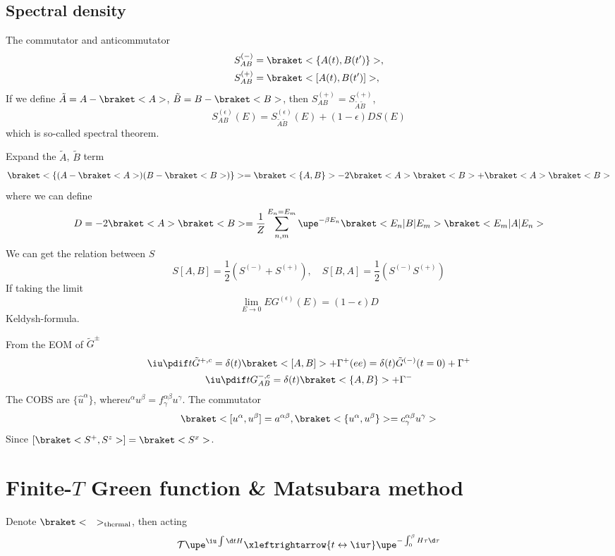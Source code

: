 \subsection{Spectral density}

The commutator and anticommutator
\begin{align*}
  S_{AB}^{(-)} & = \braket<\{A(t), B(t')\}>,\\
  S_{AB}^{(+)} & = \braket<[A(t), B(t')]>,
\end{align*}
If we define $\tilde A = A - \braket<A>$, $\tilde B = B - \braket<B>$,
then $S_{AB}^{(+)} = S_{\tilde A\tilde B}^{(+)}$,
\begin{equation}
  S_{AB}^{(\epsilon)}(E) = S_{\tilde A\tilde B}^{(\epsilon)}(E) + (1 - \epsilon) DS(E)
\end{equation}
which is so-called spectral theorem.

Expand the $\tilde A$, $\tilde B$ term
\[
  \braket<\{(A - \braket<A>)(B - \braket<B>)\}> = \braket<\{A,B\}> - 2\braket<A>\braket<B> + \braket<A>\braket<B>
\]
where we can define
\begin{equation}
  D = -2\braket<A>\braket<B> = \frac1Z \sum_{n,m}^{E_n=E_m}\upe^{-\beta E_n}
  \braket<E_n|B|E_m>\braket<E_m|A|E_n>
\end{equation}
We can get the relation between $S$
\[
  S[A,B] = \frac12(S^{(-)} + S^{(+)}), \quad
  S[B,A] = \frac12(S^{(-)}  S^{(+)})
\]
If taking the limit
\[
  \lim_{E\to0}EG^(\epsilon)(E) = (1 - \epsilon) D
\]
Keldysh-formula.

From the EOM of $\tilde G^\pm$
\begin{gather}
  \iu\pdif t \tilde G^{+,c} = \delta(t) \braket<[A,B]> + \Gamma^+ (ee)= \delta(t) \tilde G^{(-)}(t = 0) + \Gamma^+\\
  \iu\pdif t G_{AB}^{-,c} = \delta(t) \braket<\{A,B\}> + \Gamma^-
\end{gather}
The COBS are $\{\hat u^\alpha\}$, where$u^\alpha u^\beta = f^{\alpha\beta}_\gamma u^\gamma$. The commutator
\[
  \braket<[u^\alpha, u^\beta] = a^{\alpha\beta},
  \braket<\{u^\alpha, u^\beta\}> = c^{\alpha\beta}_\gamma u^\gamma>
\]
Since $[\braket<S^+, S^z>] = \braket<S^x>$.

\section{Finite-$T$ Green function \& Matsubara method}

Denote $\braket<\quad>_\text{thermal}$, then acting
\begin{equation}
  \mathcal T \upe^{\iu \int \d t H} \xleftrightarrow{t\leftrightarrow\iu\tau}
  \upe^{-\int_0^\beta H\tau \d\tau}
\end{equation}

